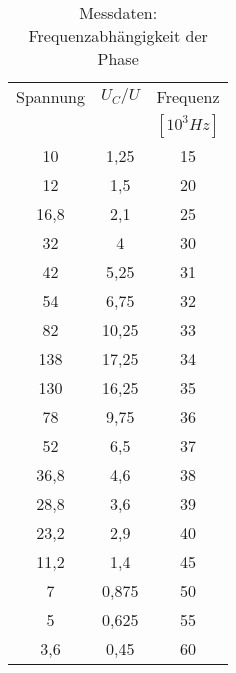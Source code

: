 
\begin{table}[h!]
  \centering
  \caption{Messdaten: Frequenzabhängigkeit der Phase}
  \label{tab:amp}
  \begin{tabular}{c c c}
    \toprule
Spannung & $U_C/U$ &Frequenz\\
[V] & & $[10^{3}Hz]$\\
    \midrule
  10		&  1,25	  & 15\\
  12		&  1,5	  & 20\\
  16,8	&	 2,1	  & 25\\
  32		&  4	    & 30\\
  42		&  5,25 	& 31\\
  54		&  6,75 	& 32\\
  82		&  10,25	& 33\\
  138		&  17,25	& 34\\
  130		&  16,25	& 35\\
  78		&  9,75 	& 36\\
  52		&  6,5	  & 37\\
  36,8	&	 4,6	  & 38\\
  28,8	&	 3,6	  & 39\\
  23,2	&	 2,9	  & 40\\
  11,2	&	 1,4	  & 45\\
  7		  &  0,875	& 50\\
  5		  &  0,625	& 55\\
  3,6		&  0,45	  & 60\\





    \bottomrule
  \end{tabular}
\end{table}
